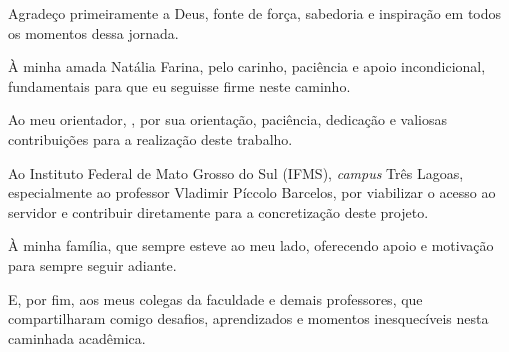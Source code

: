 \begin{agradecimentos}
    Agradeço primeiramente a Deus, fonte de força, sabedoria e inspiração em todos os momentos dessa jornada.
    
    À minha amada Natália Farina, pelo carinho, paciência e apoio incondicional, fundamentais para que eu seguisse firme neste caminho.
    
    Ao meu orientador, \imprimirorientador, por sua orientação, paciência, dedicação e valiosas contribuições para a realização deste trabalho. 
    
    Ao Instituto Federal de Mato Grosso do Sul (IFMS), \textit{campus} Três Lagoas, especialmente ao professor Vladimir Píccolo Barcelos, por viabilizar o acesso ao servidor e contribuir diretamente para a concretização deste projeto.
    
    À minha família, que sempre esteve ao meu lado, oferecendo apoio e motivação para sempre seguir adiante. 
    
    E, por fim, aos meus colegas da faculdade e demais professores, que compartilharam comigo desafios, aprendizados e momentos inesquecíveis nesta caminhada acadêmica.
\end{agradecimentos}